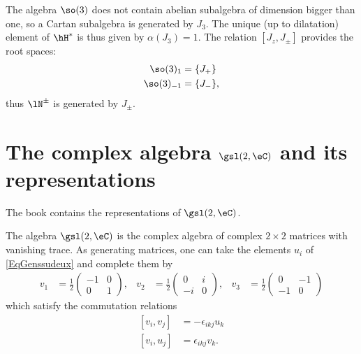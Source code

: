 The algebra $\so(3)$ does not contain abelian subalgebra of dimension bigger than one, so a Cartan subalgebra is generated by $J_3$. The unique (up to dilatation) element of $\hH^*$ is thus given by $\alpha(J_3)=1$. The relation $[J_z,J_{\pm}]$ provides the root spaces:
\begin{equation}
    \begin{aligned}
        \so(3)_1    &=\{ J_+ \}\\
        \so(3)_{-1} &=\{ J_- \},
    \end{aligned}
\end{equation}
thus $\lN^{\pm}$ is generated by $J_{\pm}$.

                    \section{The complex algebra \texorpdfstring{$\protect\gsl(2,\eC)$}{sl2C} and its representations}
\label{SecsldeuxCandrepres}

The book \cite{Kassel} contains the representations of \( \gsl(2,\eC)\).

The algebra $\gsl(2,\eC)$ is the complex algebra of complex $2\times 2$ matrices with vanishing trace. As generating matrices, one can take the elements $u_i$ of \eqref{EqGenssudeux} and complete them by
\begin{align*}
v_1&=\frac{ 1 }{2}
\begin{pmatrix}
  -1    &   0   \\
  0 &   1
\end{pmatrix},
&v_2&=\frac{ 1 }{2}
\begin{pmatrix}
  0 &   i   \\
  -i    &   0
\end{pmatrix},
&v_3&=\frac{ 1 }{2}
\begin{pmatrix}
  0 &   -1  \\
  -1    &   0
\end{pmatrix}
\end{align*}
which satisfy the commutation relations
\begin{subequations}
\begin{align}
    [v_i,v_j]&=-\epsilon_{ikj}u_k\\
    [v_i,u_j]&=\epsilon_{ikj}v_k.
\end{align}
\end{subequations}

